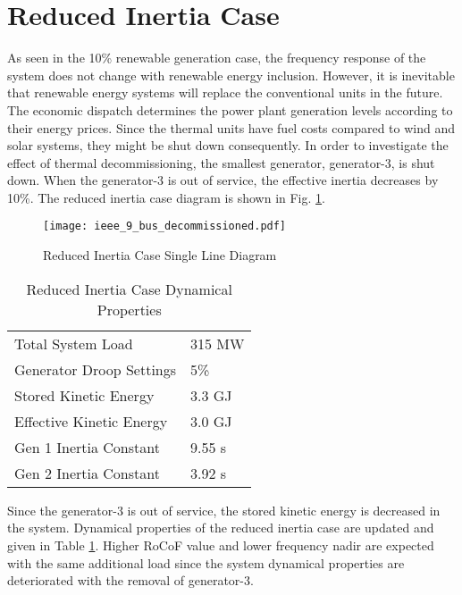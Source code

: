 \section{Reduced Inertia Case}
\label{sec:kdecommissioned}
As seen in the 10\% renewable generation case, the frequency response of the system does not change with renewable energy inclusion. However, it is inevitable that renewable energy systems will replace the conventional units in the future. The economic dispatch determines the power plant generation levels according to their energy prices. Since the thermal units have fuel costs compared to wind and solar systems, they might be shut down consequently. In order to investigate the effect of thermal decommissioning, the smallest generator, generator-3, is shut down. When the generator-3 is out of service, the effective inertia decreases by 10\%. The reduced inertia case diagram is shown in Fig. \ref{decommissioned_case}.\par
\begin{figure}[h!]
	\centering
	\texttt{[image: ieee\_9\_bus\_decommissioned.pdf]}
	\caption{Reduced Inertia Case Single Line Diagram}
	\label{decommissioned_case}
\end{figure}
\begin{table}[h]
	\centering
	\begin{tabular}{ll}
		\hline
		Total System Load                      & 315 MW    \\
		Generator Droop Settings               & 5\%       \\
		Stored Kinetic Energy 				   & 3.3 GJ \\
		Effective Kinetic Energy 			   & 3.0 GJ \\
		Gen 1 Inertia Constant                 & 9.55 s  \\
		Gen 2 Inertia Constant                 & 3.92 s  \\
		\hline
	\end{tabular}
	\caption{Reduced Inertia Case Dynamical Properties}
	\label{systemdynamicaldatacase3}
\end{table}
Since the generator-3 is out of service, the stored kinetic energy is decreased in the system. Dynamical properties of the reduced inertia case are updated and given in Table \ref{systemdynamicaldatacase3}. Higher RoCoF value and lower frequency nadir are expected with the same additional load since the system dynamical properties are deteriorated with the removal of generator-3.
